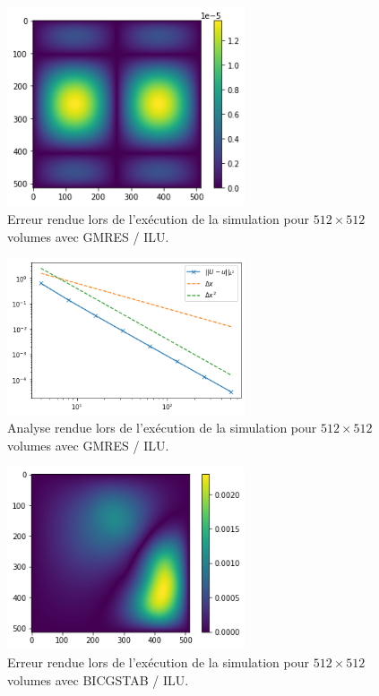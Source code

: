 \begin{figure}[htp]
    \centering
    \includegraphics[width=7cm]{Images/preliminaires/Laplace Dirichlet 2D creux GMRES Precond/erreurLU.png}
    \caption{Erreur rendue lors de l'exécution de la simulation pour $512 \times 512$ volumes avec GMRES / ILU.}
\end{figure}

\begin{figure}[htp]
    \centering
    \includegraphics[width=7cm]{Images/preliminaires/Laplace Dirichlet 2D creux GMRES Precond/analyseLU.png}
    \caption{Analyse rendue lors de l'exécution de la simulation pour $512 \times 512$ volumes avec GMRES / ILU.}
    \label{fig:creuxLaplacien2DGMRESPrecondILU}
\end{figure}

\begin{figure}[htp]
    \centering
    \includegraphics[width=7cm]{Images/preliminaires/Laplace Dirichlet 2D creux BICGSTAB Precond/erreurILU.png}
    \caption{Erreur rendue lors de l'exécution de la simulation pour $512 \times 512$ volumes avec BICGSTAB / ILU.}
\end{figure}

